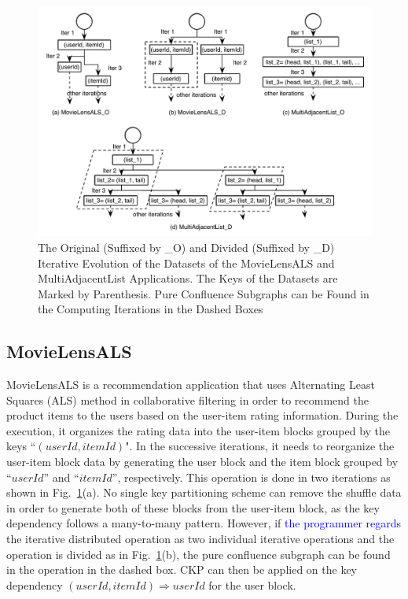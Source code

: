 \documentclass[10pt,journal,compsoc]{IEEEtran}
\newcommand{\blue}[1]{\textcolor{blue}{#1}}
\begin{document}
\begin{figure}[!t]
\centering
\includegraphics[width=2\columnwidth]{figure4}
\caption{The Original (Suffixed by \_O) and Divided (Suffixed by \_D) Iterative Evolution of the Datasets of the MovieLensALS and MultiAdjacentList Applications. The Keys of the Datasets are Marked by Parenthesis. Pure Confluence Subgraphs can be Found in the Computing Iterations in the Dashed Boxes
}
\label{fig:alsDivision}
\end{figure}


\subsection{MovieLensALS}
MovieLensALS \cite{movielensals} is a
recommendation application that uses Alternating Least Squares (ALS)
method in collaborative filtering in order to recommend the product
items to the users based on the user-item rating information.
During the execution, it organizes the rating data into the user-item
blocks grouped by the keys ``$(userId, itemId)$".
In the successive iterations, it needs to reorganize the user-item block
data by generating the user block and the item block grouped by
``$userId$'' and ``$itemId$'', respectively.
This operation is done in two iterations as shown in Fig.~\ref{fig:alsDivision}(a). 
No single key partitioning scheme can remove the shuffle data in order
to generate both of these blocks from the user-item block, as the key
dependency follows a many-to-many pattern.
However, if \blue{the programmer regards} the iterative distributed operation as two
individual iterative operations and the operation is divided as in
Fig.~\ref{fig:alsDivision}(b), the pure confluence subgraph can be found in
the operation in the dashed box.
CKP can then be applied on the key dependency $(userId, itemId) \Rightarrow
userId$ for the user block.
\end{document}
